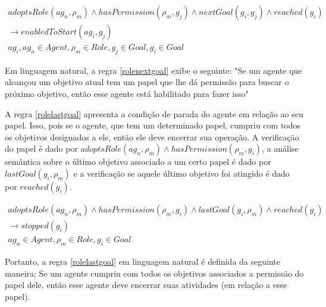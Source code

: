 \begin{eqnarray}\label{rolenextgoal}
	adoptsRole(ag_n,\rho_m) \wedge hasPermission(\rho_m,g_j) \wedge nextGoal(g_i,g_j) \wedge reached(g_i) \nonumber \\
	\to enabledToStart(ag_i,g_j) \nonumber \\
    ag_i, ag_n \in Agent, \rho_m \in Role, g_j \in Goal, g_i \in Goal
\end{eqnarray}

Em linguagem natural, a regra \ref{rolenextgoal} exibe o seguinte: "Se um agente que alcançou um objetivo atual tem um papel que lhe dá permissão para buscar o próximo objetivo, então esse agente está habilitado para fazer isso"

A regra \ref{rolelastgoal} apresenta a condição de parada do agente em relação ao seu papel. Isso, pois se o agente, que tem um determinado papel, cumpriu com todos os objetivos designados a ele, então ele deve encerrar sua operação. A verificação do papel é dado por $adoptsRole(ag_n,\rho_m) \wedge hasPermission(\rho_m,g_i)$, a análise semântica sobre o último objetivo associado a um certo papel é dado por $lastGoal(g_i,\rho_m)$ e a verificação se aquele último objetivo foi atingido é dado por $reached(g_i)$. 

\begin{eqnarray}\label{rolelastgoal}
	adoptsRole(ag_n,\rho_m) \wedge hasPermission(\rho_m,g_i) \wedge lastGoal(g_i,\rho_m) \wedge reached(g_i) \nonumber \\
	\to stopped(g_i) \nonumber \\
    ag_n \in Agent, \rho_m \in Role, g_i \in Goal
\end{eqnarray}

Portanto, a regra \ref{rolelastgoal} em linguagem natural é definida da seguinte maneira; Se um agente cumpriu com todos os objetivos associados a permissão do papel dele, então esse agente deve encerrar suas atividades (em relação a esse papel). 

